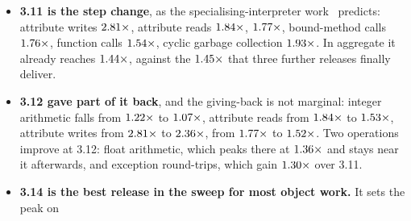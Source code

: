 \begin{itemize}[leftmargin=1.4em,itemsep=1pt]
  \item \textbf{3.11 is the step change}, as the specialising-interpreter work~\cite{pep659}
        predicts: attribute writes $\meas{ratio:b3_runtime-v310:attr_set/v310|b3_runtime-v311:attr_set/v311}{2.81}\times$, attribute reads $\meas{ratio:b3_runtime-v310:attr_get/v310|b3_runtime-v311:attr_get/v311}{1.84}\times$, 
        $\meas{ratio:b3_runtime-v310:list_append/v310|b3_runtime-v311:list_append/v311}{1.77}\times$, bound-method calls $\meas{ratio:b3_runtime-v310:method_call/v310|b3_runtime-v311:method_call/v311}{1.76}\times$, function calls $\meas{ratio:b3_runtime-v310:func_call/v310|b3_runtime-v311:func_call/v311}{1.54}\times$, cyclic
        garbage collection $\meas{ratio:b3_runtime-v310:gc_collect_100k_cycles/v310|b3_runtime-v311:gc_collect_100k_cycles/v311}{1.93}\times$. In aggregate it already reaches $\meas{geomean:b3_runtime-v310|b3_runtime-v311}{1.44}\times$, against
        the $\meas{geomean:b3_runtime-v310|b3_runtime-v314}{1.45}\times$ that three further releases finally deliver.
  \item \textbf{3.12 gave part of it back}, and the giving-back is not marginal: integer
        arithmetic falls from $\meas{ratio:b3_runtime-v310:int_arith/v310|b3_runtime-v311:int_arith/v311}{1.22}\times$ to $\meas{ratio:b3_runtime-v310:int_arith/v310|b3_runtime-v312:int_arith/v312}{1.07}\times$, attribute reads from $\meas{ratio:b3_runtime-v310:attr_get/v310|b3_runtime-v311:attr_get/v311}{1.84}\times$
        to $\meas{ratio:b3_runtime-v310:attr_get/v310|b3_runtime-v312:attr_get/v312}{1.53}\times$, attribute writes from $\meas{ratio:b3_runtime-v310:attr_set/v310|b3_runtime-v311:attr_set/v311}{2.81}\times$ to $\meas{ratio:b3_runtime-v310:attr_set/v310|b3_runtime-v312:attr_set/v312}{2.36}\times$, 
        from $\meas{ratio:b3_runtime-v310:list_append/v310|b3_runtime-v311:list_append/v311}{1.77}\times$ to $\meas{ratio:b3_runtime-v310:list_append/v310|b3_runtime-v312:list_append/v312}{1.52}\times$. Two operations improve at 3.12: float arithmetic, which
        peaks there at $\meas{ratio:b3_runtime-v310:float_arith/v310|b3_runtime-v312:float_arith/v312}{1.36}\times$ and stays near it afterwards, and exception round-trips,
        which gain $\meas{ratio:b3_runtime-v311:exception_roundtrip/v311|b3_runtime-v312:exception_roundtrip/v312}{1.30}\times$ over 3.11.
  \item \textbf{3.14 is the best release in the sweep for most object work.} It sets the peak on

\end{itemize}
